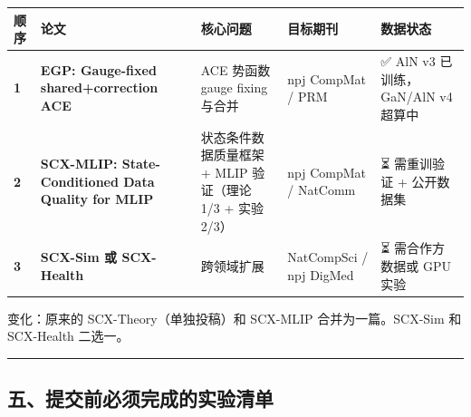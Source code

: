 \documentclass[
  12pt,
]{ctexart}
\begin{document}
\begin{longtable}[]{@{}
  >{\raggedright\arraybackslash}p{}
  >{\raggedright\arraybackslash}p{}
  >{\raggedright\arraybackslash}p{}
  >{\raggedright\arraybackslash}p{}
  >{\raggedright\arraybackslash}p{}@{}}
\toprule\noalign{}
\begin{minipage}[b]{\linewidth}\raggedright
顺序
\end{minipage} & \begin{minipage}[b]{\linewidth}\raggedright
论文
\end{minipage} & \begin{minipage}[b]{\linewidth}\raggedright
核心问题
\end{minipage} & \begin{minipage}[b]{\linewidth}\raggedright
目标期刊
\end{minipage} & \begin{minipage}[b]{\linewidth}\raggedright
数据状态
\end{minipage} \\
\midrule\noalign{}
\endhead
\bottomrule\noalign{}
\endlastfoot
\textbf{1} & \textbf{EGP: Gauge-fixed shared+correction ACE} & ACE
势函数 gauge fixing 与合并 & npj CompMat / PRM & ✅ AlN v3
已训练，GaN/AlN v4 超算中 \\
\textbf{2} & \textbf{SCX-MLIP: State-Conditioned Data Quality for MLIP}
& 状态条件数据质量框架 + MLIP 验证（理论 1/3 + 实验 2/3） & npj CompMat
/ NatComm & ⏳ 需重训验证 + 公开数据集 \\
\textbf{3} & \textbf{SCX-Sim 或 SCX-Health} & 跨领域扩展 & NatCompSci /
npj DigMed & ⏳ 需合作方数据或 GPU 实验 \\
\end{longtable}

变化：原来的 SCX-Theory（单独投稿）和 SCX-MLIP 合并为一篇。SCX-Sim 和
SCX-Health 二选一。

\begin{center}\rule{0.5\linewidth}{0.5pt}\end{center}

\subsection{五、提交前必须完成的实验清单}\label{ux4e94ux63d0ux4ea4ux524dux5fc5ux987bux5b8cux6210ux7684ux5b9eux9a8cux6e05ux5355}
\end{document}
